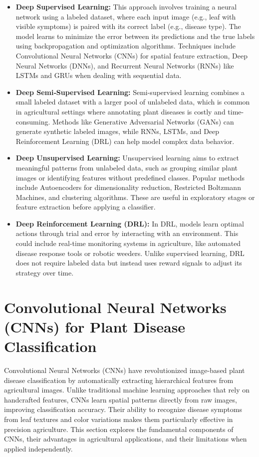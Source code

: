 \begin{itemize}
    \item \textbf{Deep Supervised Learning:} This approach involves training a neural network using a labeled dataset, where each input image (e.g., leaf with visible symptoms) is paired with its correct label (e.g., disease type). The model learns to minimize the error between its predictions and the true labels using backpropagation and optimization algorithms. Techniques include Convolutional Neural Networks (CNNs) for spatial feature extraction, Deep Neural Networks (DNNs), and Recurrent Neural Networks (RNNs) like LSTMs and GRUs when dealing with sequential data.
    
    \item \textbf{Deep Semi‐Supervised Learning:} Semi-supervised learning combines a small labeled dataset with a larger pool of unlabeled data, which is common in agricultural settings where annotating plant diseases is costly and time-consuming. Methods like Generative Adversarial Networks (GANs) can generate synthetic labeled images, while RNNs, LSTMs, and Deep Reinforcement Learning (DRL) can help model complex data behavior.
    
    \item \textbf{Deep Unsupervised Learning:} Unsupervised learning aims to extract meaningful patterns from unlabeled data, such as grouping similar plant images or identifying features without predefined classes. Popular methods include Autoencoders for dimensionality reduction, Restricted Boltzmann Machines, and clustering algorithms. These are useful in exploratory stages or feature extraction before applying a classifier.
    
    \item \textbf{Deep Reinforcement Learning (DRL):} In DRL, models learn optimal actions through trial and error by interacting with an environment. This could include real-time monitoring systems in agriculture, like automated disease response tools or robotic weeders. Unlike supervised learning, DRL does not require labeled data but instead uses reward signals to adjust its strategy over time.
\end{itemize}

\section{Convolutional Neural Networks (CNNs) for Plant Disease Classification}

Convolutional Neural Networks (CNNs) have revolutionized image-based plant disease classification by automatically extracting hierarchical features from agricultural images. Unlike traditional machine learning approaches that rely on handcrafted features, CNNs learn spatial patterns directly from raw images, improving classification accuracy. Their ability to recognize disease symptoms from leaf textures and color variations makes them particularly effective in precision agriculture. This section explores the fundamental components of CNNs, their advantages in agricultural applications, and their limitations when applied independently.

